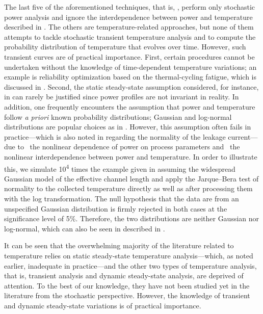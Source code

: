 The last five of the aforementioned techniques, that is, \cite{bhardwaj2006,
vrudhula2006, ghanta2006, bhardwaj2008, shen2009}, perform only stochastic power
analysis and ignore the interdependence between power and temperature described
in . The others are temperature-related approaches, but none
of them attempts to tackle stochastic transient temperature analysis and to
compute the probability distribution of temperature that evolves over time.
However, such transient curves are of practical importance. First, certain
procedures cannot be undertaken without the knowledge of time-dependent
temperature variations; an example is reliability optimization based on the
thermal-cycling fatigue, which is discussed in .
Second, the static steady-state assumption considered, for instance, in
\cite{huang2009a, juan2011, juan2012, lee2013} can rarely be justified since
power profiles are not invariant in reality. In addition, one frequently
encounters the assumption that power and temperature follow \emph{a priori}
known probability distributions; Gaussian and log-normal distributions are
popular choices as in \cite{bhardwaj2006, srivastava2010, juan2012}. However,
this assumption often fails in practice---which is also noted in \cite{juan2012}
regarding the normality of the leakage current---due to \one~the nonlinear
dependence of power on process parameters and \two~the nonlinear interdependence
between power and temperature. In order to illustrate this, we simulate
10\textsuperscript{4} times the example given in  assuming
the widespread Gaussian model of the effective channel length and apply the
Jarque--Bera test of normality to the collected temperature directly as well as
after processing them with the log transformation. The null hypothesis that the
data are from an unspecified Gaussian distribution is firmly rejected in both
cases at the significance level of 5\%. Therefore, the two distributions are
neither Gaussian nor log-normal, which can also be seen in
 described in .

It can be seen that the overwhelming majority of the literature related to
temperature relies on static steady-state temperature analysis---which, as noted
earlier, inadequate in practice---and the other two types of temperature
analysis, that is, transient analysis and dynamic steady-state analysis, are
deprived of attention. To the best of our knowledge, they have not been studied
yet in the literature from the stochastic perspective. However, the knowledge of
transient and dynamic steady-state variations is of practical importance.

